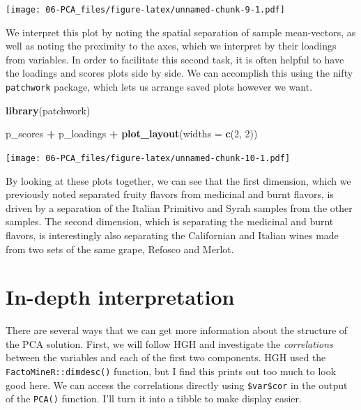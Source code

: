 \documentclass[
]{book}
\newenvironment{Shaded}{\begin{snugshade}}{\end{snugshade}}
\newcommand{\AttributeTok}[1]{\textcolor[rgb]{0.13,0.29,0.53}{#1}}
\newcommand{\DecValTok}[1]{\textcolor[rgb]{0.00,0.00,0.81}{#1}}
\newcommand{\FunctionTok}[1]{\textcolor[rgb]{0.13,0.29,0.53}{\textbf{#1}}}
\newcommand{\NormalTok}[1]{#1}
\newcommand{\SpecialCharTok}[1]{\textcolor[rgb]{0.81,0.36,0.00}{\textbf{#1}}}
\begin{document}
\texttt{[image: 06-PCA\_files/figure-latex/unnamed-chunk-9-1.pdf]}

We interpret this plot by noting the spatial separation of sample mean-vectors, as well as noting the proximity to the axes, which we interpret by their loadings from variables. In order to facilitate this second task, it is often helpful to have the loadings and scores plots side by side. We can accomplish this using the nifty \texttt{patchwork} package, which lets us arrange saved plots however we want.

\begin{Shaded}
\begin{Highlighting}[]
\FunctionTok{library}\NormalTok{(patchwork)}

\NormalTok{p\_scores }\SpecialCharTok{+}\NormalTok{ p\_loadings }\SpecialCharTok{+} \FunctionTok{plot\_layout}\NormalTok{(}\AttributeTok{widths =} \FunctionTok{c}\NormalTok{(}\DecValTok{2}\NormalTok{, }\DecValTok{2}\NormalTok{))}
\end{Highlighting}
\end{Shaded}

\texttt{[image: 06-PCA\_files/figure-latex/unnamed-chunk-10-1.pdf]}

By looking at these plots together, we can see that the first dimension, which we previously noted separated fruity flavors from medicinal and burnt flavors, is driven by a separation of the Italian Primitivo and Syrah samples from the other samples. The second dimension, which is separating the medicinal and burnt flavors, is interestingly also separating the Californian and Italian wines made from two sets of the same grape, Refosco and Merlot.

\section{In-depth interpretation}\label{in-depth-interpretation}

There are several ways that we can get more information about the structure of the PCA solution. First, we will follow HGH and investigate the \emph{correlations} between the variables and each of the first two components. HGH used the \texttt{FactoMineR::dimdesc()} function, but I find this prints out too much to look good here. We can access the correlations directly using \texttt{\$var\$cor} in the output of the \texttt{PCA()} function. I'll turn it into a tibble to make display easier.
\end{document}
